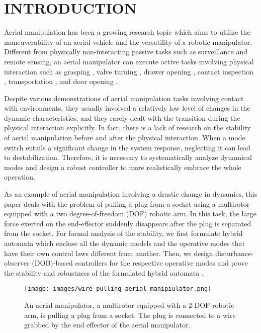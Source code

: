 \documentclass[letterpaper, 10 pt, conference]{ieeeconf}  %
\theoremstyle{definition}
\begin{document}
\section{INTRODUCTION}
Aerial manipulation has been a growing research topic which aims to utilize the maneuverability of an aerial vehicle and the versatility of a robotic manipulator. Different from physically non-interacting passive tasks such as surveillance and remote sensing, an aerial manipulator can execute active tasks involving physical interaction such as grasping \cite{kim2013aerial,kim2019sampling}, valve turning \cite{korpela2014towards}, drawer opening \cite{kim2015operating}, contact inspection \cite{jimenez2015aerial}, transportation \cite{lee2016estimation,byun2020line}, and door opening \cite{lee2020aerial_1}. 

Despite various demonstrations of aerial manipulation tasks involving contact with environments, they usually involved a relatively low level of changes in the dynamic characteristics, and they rarely dealt with the transition during the physical interaction explicitly. In fact, there is a lack of research on the stability of aerial manipulation before and after the physical interaction. When a mode switch entails a significant change in the system response, neglecting it can lead to destabilization. Therefore, it is necessary to systematically analyze dynamical modes and design a robust controller to more realistically embrace the whole operation. 

As an example of aerial manipulation involving a drastic {change in dynamics}, this paper deals with the problem of pulling a plug from a socket using a multirotor equipped with a two degree-of-freedom (DOF) robotic arm. In this task, the large force exerted on the end-effector suddenly disappears after the plug is separated from the socket. For formal analysis of the stability, we first formulate hybrid automata \cite{goebel2009hybrid} which enclose all the dynamic models and the operative modes that have their own control laws different from another. Then, we design disturbance-observer (DOB)-based controllers \cite{back2009inner} for the respective operative modes and prove the stability and robustness of the formulated hybrid automata \cite{marconi2009control}.
\begin{figure}[t]
\centering
\texttt{[image: images/wire\_pulling\_aerial\_manipiulator.png]}
\caption{An aerial manipulator, a multirotor equipped with a 2-DOF robotic arm, is pulling a plug from a socket. The plug is connected to a wire grabbed by the end effector of the aerial manipulator.} \label{fig: wire-pulling aerial manipulator}
\vspace{-0.5cm}
\end{figure}
\end{document}
